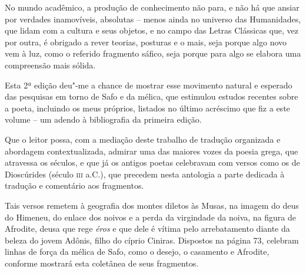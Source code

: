 No mundo acadêmico, a produção de conhecimento não para, e não há que
ansiar por verdades inamovíveis, absolutas -- menos ainda no universo
das Humanidades, que lidam com a cultura e seus objetos,
e no campo das Letras Clássicas que, vez por outra, é obrigado a rever
teorias, posturas e o mais, seja porque algo novo vem à luz, como o 
referido fragmento sáfico, seja porque para algo se elabora uma compreensão mais
sólida.

Esta 2ª edição deu"-me a chance de mostrar esse movimento natural e
esperado das pesquisas em torno de Safo e da mélica, que estimulou
estudos recentes sobre a poeta, incluindo os meus próprios, listados no
último acréscimo que fiz a este volume -- um adendo à bibliografia
da primeira edição.

Que o leitor possa, com a mediação deste trabalho de tradução organizada
e abordagem contextualizada, admirar uma das maiores vozes da poesia grega, que
atravessa os séculos, e que já os antigos poetas celebravam com versos
como os de Dioscúrides (século \textsc{iii} a.C.), que precedem nesta antologia 
a parte dedicada à tradução e comentário aos fragmentos.

Tais versos remetem à geografia dos montes diletos às Musas, na imagem do deus 
do Himeneu, do enlace dos noivos 
e a perda da virgindade da noiva, na figura de Afrodite, deusa 
que rege \textit{éros} e que dele é vítima pelo arrebatamento diante 
da beleza do jovem Adônis, filho do cíprio Ciniras. Dispostos na página 73, celebram 
linhas de força da mélica de Safo, como o desejo, o casamento e Afrodite, 
conforme mostrará esta coletânea de seus fragmentos. 

